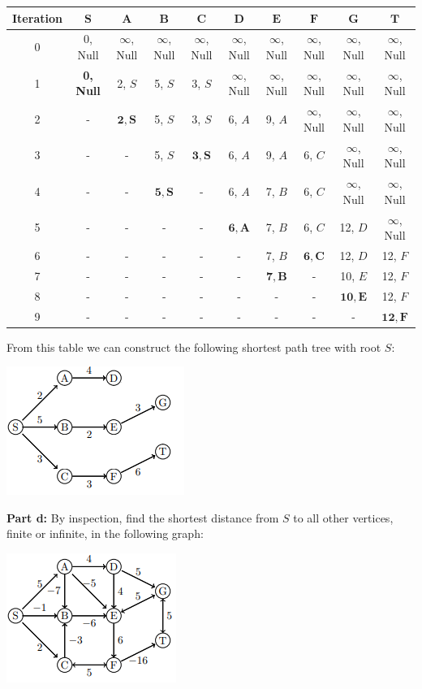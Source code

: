 \documentclass{article}
\begin{document}
\hspace*{-0.4in}
\begin{tabular}{c|c|c|c|c|c|c|c|c|c}
  \textbf{Iteration} & $\bm{S}$ & $\bm{A}$ & $\bm{B}$ & $\bm{C}$ & $\bm{D}$ & $\bm{E}$ & $\bm{F}$ & $\bm{G}$ & $\bm{T}$\\\hline
  0 & 0, Null & $\infty$, Null & $\infty$, Null & $\infty$, Null & $\infty$, Null & $\infty$, Null & $\infty$, Null & $\infty$, Null & $\infty$, Null\\
  \hline
  1 & \textbf{0, Null} & 2, $S$ & 5, $S$ & 3, $S$ & $\infty$, Null & $\infty$, Null & $\infty$, Null & $\infty$, Null & $\infty$, Null\\
  \hline
  2 & - & $\bm{2, S}$ & 5, $S$ & 3, $S$ & 6, $A$ & 9, $A$ & $\infty$, Null & $\infty$, Null & $\infty$, Null\\
  \hline
  3 & - & - & 5, $S$ & $\bm{3, S}$ & 6, $A$ & 9, $A$ & 6, $C$ & $\infty$, Null & $\infty$, Null\\
  \hline
  4 & - & - & $\bm{5, S}$ & - & 6, $A$ & 7, $B$ & 6, $C$ & $\infty$, Null & $\infty$, Null\\
  \hline
  5 & - & - & - & - & $\bm{6, A}$ & 7, $B$ & 6, $C$ & 12, $D$ & $\infty$, Null\\
  \hline
  6 & - & - & - & - & - & 7, $B$ & $\bm{6, C}$ & 12, $D$ & 12, $F$\\
  \hline
  7 & - & - & - & - & - & $\bm{7, B}$ & - & 10, $E$ & 12, $F$\\
  \hline
  8 & - & - & - & - & - & - & - & $\bm{10, E}$ & 12, $F$\\
  \hline
  9 & - & - & - & - & - & - & - & - & $\bm{12, F}$
\end{tabular}
\bigskip

From this table we can construct the following shortest path tree with root $S$:
\begin{center}
  \includegraphics{graph4cSPT.png}
\end{center}

\noindent\textbf{Part d:} By inspection, find the shortest distance from $S$ to all other vertices, finite or infinite, in the following graph:
\begin{center}
  \includegraphics{graph4d.png}
\end{center}
\end{document}
